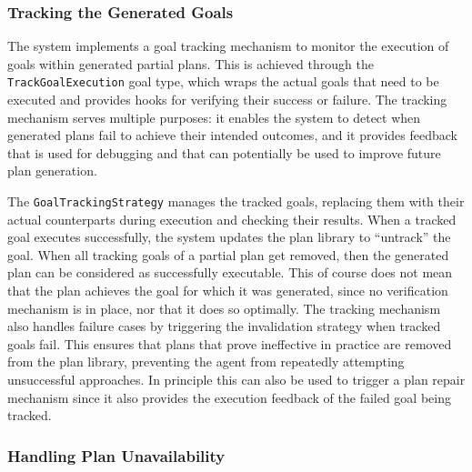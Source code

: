 \documentclass[12pt,a4paper,openright,twoside]{book}
\begin{document}
\subsubsection{Tracking the Generated Goals}\label{sec:tracking-goals}

The system implements a goal tracking mechanism to monitor the execution of goals within generated partial plans.
%
This is achieved through the \texttt{TrackGoalExecution} goal type, which wraps the actual goals that need to be executed and provides hooks for verifying their success or failure.
%
The tracking mechanism serves multiple purposes: it enables the system to detect when generated plans fail to achieve their intended outcomes, and it provides feedback that is used for debugging and that can potentially be used to improve future plan generation.

The \texttt{GoalTrackingStrategy} manages the tracked goals, replacing them with their actual counterparts during execution and checking their results. 
%
When a tracked goal executes successfully, the system updates the plan library to ``untrack'' the goal.
%
When all tracking goals of a partial plan get removed, then the generated plan can be considered as successfully executable.
%
This of course does not mean that the plan achieves the goal for which it was generated, since no verification mechanism is in place, nor that it does so optimally. 
%
The tracking mechanism also handles failure cases by triggering the invalidation strategy when tracked goals fail. 
%
This ensures that plans that prove ineffective in practice are removed from the plan library, preventing the agent from repeatedly attempting unsuccessful approaches. 
%
In principle this can also be used to trigger a plan repair mechanism since it also provides the execution feedback of the failed goal being tracked.

\subsubsection{Handling Plan Unavailability}\label{sec:plan-unavailability}
\end{document}
